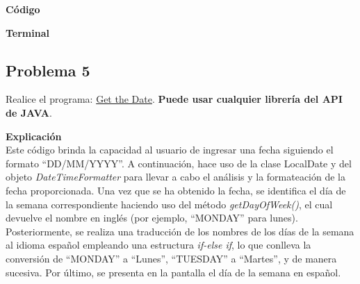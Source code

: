 \documentclass[11pt, twocolumn]{article}
\begin{document}
  \textbf{Código}


  \textbf{Terminal}

  \subsection*{Problema 5}
  Realice el programa:  \href{https://edabit.com/challenge/48EJWLhF224na8po3}{Get the Date}. \textbf{Puede usar cualquier librería del API de JAVA}.

  \textbf{Explicación} \\
  Este código brinda la capacidad al usuario de ingresar una fecha siguiendo el formato ``DD/MM/YYYY''. A continuación, hace uso de la clase LocalDate y del objeto \textit{DateTimeFormatter} para llevar a cabo el análisis y la formateación de la fecha proporcionada. Una vez que se ha obtenido la fecha, se identifica el día de la semana correspondiente haciendo uso del método \textit{getDayOfWeek()}, el cual devuelve el nombre en inglés (por ejemplo, ``MONDAY'' para lunes). Posteriormente, se realiza una traducción de los nombres de los días de la semana al idioma español empleando una estructura \textit{if-else if}, lo que conlleva la conversión de ``MONDAY'' a ``Lunes'', ``TUESDAY'' a ``Martes'', y de manera sucesiva. Por último, se presenta en la pantalla el día de la semana en español. 
  
\end{document}
